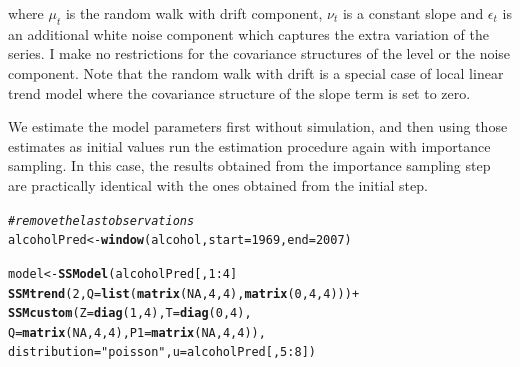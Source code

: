 \documentclass[nojss,article]{jss}\usepackage[]{graphicx}\usepackage[]{color}
\makeatletter
\newcommand{\hlnum}[1]{\textcolor[rgb]{0.686,0.059,0.569}{#1}}%
\newcommand{\hlstr}[1]{\textcolor[rgb]{0.192,0.494,0.8}{#1}}%
\newcommand{\hlcom}[1]{\textcolor[rgb]{0.678,0.584,0.686}{\textit{#1}}}%
\newcommand{\hlopt}[1]{\textcolor[rgb]{0,0,0}{#1}}%
\newcommand{\hlstd}[1]{\textcolor[rgb]{0.345,0.345,0.345}{#1}}%
\newcommand{\hlkwb}[1]{\textcolor[rgb]{0.69,0.353,0.396}{#1}}%
\newcommand{\hlkwc}[1]{\textcolor[rgb]{0.333,0.667,0.333}{#1}}%
\newcommand{\hlkwd}[1]{\textcolor[rgb]{0.737,0.353,0.396}{\textbf{#1}}}%
\newenvironment{kframe}{%
 \def\at@end@of@kframe{}%
 \ifinner\ifhmode%
  \def\at@end@of@kframe{\end{minipage}}%
  \begin{minipage}{\columnwidth}%
 \fi\fi%
 \def\FrameCommand##1{\hskip\@totalleftmargin \hskip-\fboxsep
 \colorbox{shadecolor}{##1}\hskip-\fboxsep
     \hskip-\linewidth \hskip-\@totalleftmargin \hskip\columnwidth}%
 \MakeFramed {\advance\hsize-\width
   \@totalleftmargin\z@ \linewidth\hsize
   \@setminipage}}%
 {\par\unskip\endMakeFramed%
 \at@end@of@kframe}
\newenvironment{knitrout}{}{} %
\makeatother
\begin{document}
where $\mu_t$ is the random walk with drift component, $\nu_t$ is a constant slope and $\epsilon_t$ is an additional white noise component which captures the extra variation of the series. I make no restrictions for the covariance structures of the level or the noise component. Note that the random walk with drift is a special case of local linear trend model where the covariance structure of the slope term is set to zero.


We estimate the model parameters first without simulation, and then using those estimates as initial values run the estimation procedure again with importance sampling. In this case, the results obtained from the importance sampling step are practically identical with the ones obtained from the initial step.

\begin{knitrout}
\color{fgcolor}\begin{kframe}
\begin{alltt}
\hlcom{# remove the last observations}
\hlstd{alcoholPred} \hlkwb{<-} \hlkwd{window}\hlstd{(alcohol,} \hlkwc{start} \hlstd{=} \hlnum{1969}\hlstd{,} \hlkwc{end} \hlstd{=} \hlnum{2007}\hlstd{)}

\hlstd{model} \hlkwb{<-} \hlkwd{SSModel}\hlstd{(alcoholPred[,}\hlnum{1}\hlopt{:}\hlnum{4}\hlstd{]} \hlopt{~}
                   \hlkwd{SSMtrend}\hlstd{(}\hlnum{2}\hlstd{,} \hlkwc{Q} \hlstd{=} \hlkwd{list}\hlstd{(}\hlkwd{matrix}\hlstd{(}\hlnum{NA}\hlstd{,}\hlnum{4}\hlstd{,}\hlnum{4}\hlstd{),} \hlkwd{matrix}\hlstd{(}\hlnum{0}\hlstd{,}\hlnum{4}\hlstd{,}\hlnum{4}\hlstd{)))} \hlopt{+}
                   \hlkwd{SSMcustom}\hlstd{(}\hlkwc{Z} \hlstd{=} \hlkwd{diag}\hlstd{(}\hlnum{1}\hlstd{,}\hlnum{4}\hlstd{),} \hlkwc{T} \hlstd{=} \hlkwd{diag}\hlstd{(}\hlnum{0}\hlstd{,}\hlnum{4}\hlstd{),}
                             \hlkwc{Q} \hlstd{=} \hlkwd{matrix}\hlstd{(}\hlnum{NA}\hlstd{,}\hlnum{4}\hlstd{,}\hlnum{4}\hlstd{),} \hlkwc{P1} \hlstd{=} \hlkwd{matrix}\hlstd{(}\hlnum{NA}\hlstd{,}\hlnum{4}\hlstd{,}\hlnum{4}\hlstd{)),}
                 \hlkwc{distribution} \hlstd{=} \hlstr{"poisson"}\hlstd{,} \hlkwc{u} \hlstd{= alcoholPred[,}\hlnum{5}\hlopt{:}\hlnum{8}\hlstd{])}


\end{alltt}
\end{kframe}
\end{knitrout}
\end{document}
